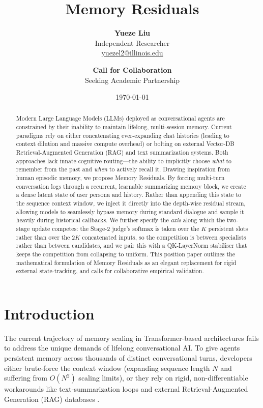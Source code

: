 \documentclass[11pt, a4paper]{article}
\title{\textbf{Memory Residuals}}
\author{
    \textbf{Yueze Liu} \\
    Independent Researcher  \\
    \href{mailto:yuezel2@illinois.edu}{yuezel2@illinois.edu} 
    \and
    \textbf{Call for Collaboration} \\
    Seeking Academic Partnership
}
\date{\today}
\begin{document}
\maketitle

\begin{abstract}
Modern Large Language Models (LLMs) deployed as conversational agents are constrained by their inability to maintain lifelong, multi-session memory. Current paradigms rely on either concatenating ever-expanding chat histories (leading to context dilution and massive compute overhead) or bolting on external Vector-DB Retrieval-Augmented Generation (RAG) and text summarization systems. Both approaches lack innate cognitive routing—the ability to implicitly choose \textit{what} to remember from the past and \textit{when} to actively recall it. Drawing inspiration from human episodic memory, we propose Memory Residuals. By forcing multi-turn conversation logs through a recurrent, learnable summarizing memory block, we create a dense latent state of user persona and history. Rather than appending this state to the sequence context window, we inject it directly into the depth-wise residual stream, allowing models to seamlessly bypass memory during standard dialogue and sample it heavily during historical callbacks. We further specify the \emph{axis} along which the two-stage update competes: the Stage-2 judge's softmax is taken over the $K$ persistent slots rather than over the $2K$ concatenated inputs, so the competition is between specialists rather than between candidates, and we pair this with a QK-LayerNorm stabiliser that keeps the competition from collapsing to uniform. This position paper outlines the mathematical formulation of Memory Residuals as an elegant replacement for rigid external state-tracking, and calls for collaborative empirical validation.
\end{abstract}

\vspace{0.5cm}

\section{Introduction}
The current trajectory of memory scaling in Transformer-based architectures \cite{vaswani2017attention} fails to address the unique demands of lifelong conversational AI. To give agents persistent memory across thousands of distinct conversational turns, developers either brute-force the context window (expanding sequence length $N$ and suffering from $O(N^2)$ scaling limits), or they rely on rigid, non-differentiable workarounds like text-summarization loops and external Retrieval-Augmented Generation (RAG) databases \cite{lewis2020retrieval}. 
\end{document}
